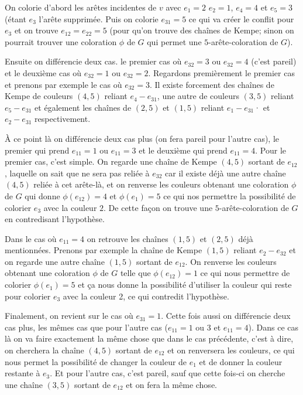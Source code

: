 \documentclass[10pt,a4paper]{article}
\begin{document}
On colorie d'abord les arêtes incidentes de $v$ avec $e_1 = 2$ $e_2 = 1$, $e_4 = 4$ et $e_5 = 3$ (étant $e_3$ l'arête supprimée. Puis on colorie $e_{31} = 5$ ce qui va créer le conflit pour $e_3$ et on trouve $e_{12} = e_{22} = 5$ (pour qu'on trouve des chaînes de Kempe; sinon on pourrait trouver une coloration $\phi$ de $G$ qui permet une $5$-arête-coloration de $G$). 

Ensuite on différencie deux cas. le premier cas où $e_{32} = 3$ ou $e_{32} = 4$ (c'est pareil) et le deuxième cas où $e_{32} = 1$ ou $e_{32} = 2$. Regardons premièrement le premier cas et prenons par exemple le cas où $e_{32} = 3$. Il existe forcement des chaînes de Kempe de couleurs $(4,5)$ reliant $e_4 -e_{31}$, une autre de couleurs $(3,5)$ reliant $e_5 -e_{31}$ et également les chaînes de $(2,5)$ et $(1,5)$ reliant $e_1 -e_{31}$· et $e_2 -e_{31}$ respectivement. 

À ce point là on différencie deux cas plus (on fera pareil pour l'autre cas), le premier qui prend $e_{11} = 1$ ou $e_{11} = 3$ et le deuxième qui prend $e_{11} = 4$. Pour le premier cas, c'est simple. On regarde une chaîne de Kempe $(4,5)$ sortant de $e_{12}$, laquelle on sait que ne sera pas reliée à $e_{32}$ car il existe déjà une autre chaîne $(4,5)$ reliée à cet arête-là, et on renverse les couleurs obtenant une coloration $\phi$ de $G$ qui donne $\phi (e_{12}) = 4$ et $\phi(e_1) = 5$ ce qui nos permettre la possibilité de colorier $e_3$ avec la couleur $2$. De cette façon on trouve une $5$-arête-coloration de $G$ en contredisant l'hypothèse. 

Dans le cas où $e_{11} =4$ on retrouve les chaînes $(1,5)$ et $(2,5)$ déjà mentionnées. Prenons par exemple la chaîne de Kempe $(1,5)$ reliant $e_2 -e_{32}$ et on regarde une autre chaîne $(1,5)$ sortant de $e_{12}$. On renverse les couleurs obtenant une coloration $\phi$ de $G$ telle que $\phi(e_{12})=1$ ce qui nous permettre de colorier $\phi(e_1) = 5$ et ça nous donne la possibilité d'utiliser la couleur qui reste pour colorier $e_3$ avec la couleur 2, ce qui contredit l'hypothèse.

Finalement, on revient sur le cas où $e_{31} = 1$. Cette fois aussi on différencie deux cas plus, les mêmes cas que pour l'autre cas ($e_{11} = 1$ ou $3$ et $e_{11} = 4$). Dans ce cas là on va faire exactement la même chose que dans le cas précédente, c'est à dire, on cherchera la chaîne $(4,5)$ sortant de $e_{12}$ et on renversera les couleurs, ce qui nous permet la possibilité de changer la couleur de $e_1$ et de donner la couleur restante à $e_3$. Et pour l'autre cas, c'est pareil, sauf que cette fois-ci on cherche une chaîne $(3,5)$ sortant de $e_{12}$ et on fera la même chose. 
\end{document}
